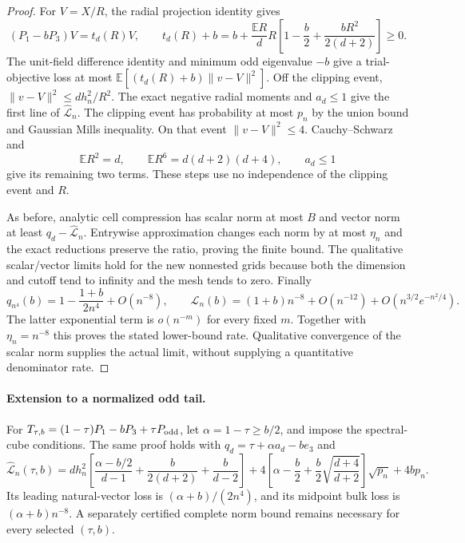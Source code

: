 \begin{proof}
For $V=X/R$, the radial projection identity gives
\[
 (P_1-bP_3)V=t_d(R)V,\qquad
 t_d(R)+b=b+\frac{\mathbb ER}{d}R
           \left[1-\frac b2+\frac{bR^2}{2(d+2)}\right]\geq0.
\]
The unit-field difference identity and minimum odd eigenvalue $-b$
give a trial-objective loss at most
$\mathbb E[(t_d(R)+b)\|v-V\|^2]$.
Off the clipping event, $\|v-V\|^2\leq dh_n^2/R^2$.
The exact negative radial moments and $a_d\leq1$ give the first
line of $\widehat{\mathcal L}_n$.  The clipping event has probability
at most $p_n$ by the union bound and Gaussian Mills inequality.
On that event $\|v-V\|^2\leq4$.  Cauchy--Schwarz and
\[
 \mathbb ER^2=d,\qquad \mathbb ER^6=d(d+2)(d+4),\qquad a_d\leq1
\]
give its remaining two terms.  These steps use no independence of
the clipping event and $R$.

As before, analytic cell compression has scalar norm at most $B$
and vector norm at least $q_d-\widehat{\mathcal L}_n$.
Entrywise approximation changes each norm by at most $\eta_n$ and
the exact reductions preserve the ratio, proving the finite bound.
The qualitative scalar/vector limits hold for the new nonnested
grids because both the dimension and cutoff tend to infinity and
the mesh tends to zero.
Finally
\[
 q_{n^4}(b)=1-\frac{1+b}{2n^4}+O(n^{-8}),\qquad
 \widehat{\mathcal L}_n(b)=(1+b)n^{-8}+O(n^{-12})
                         +O(n^{3/2}e^{-n^2/4}).
\]
The latter exponential term is $o(n^{-m})$ for every fixed $m$.
Together with $\eta_n=n^{-8}$ this proves the stated lower-bound
rate.  Qualitative convergence of the scalar norm supplies the
actual limit, without supplying a quantitative denominator rate.
\end{proof}

\paragraph{Extension to a normalized odd tail.}
For $T_{\tau,b}=(1-\tau)P_1-bP_3+\tau P_{\rm odd}$, let
$\alpha=1-\tau\geq b/2$, and impose the spectral-cube conditions.
The same proof holds with $q_d=\tau+\alpha a_d-be_3$ and
\[
 \widehat{\mathcal L}_n(\tau,b)=dh_n^2
 \left[\frac{\alpha-b/2}{d-1}+\frac b{2(d+2)}+\frac b{d-2}\right]
 +4\left[\alpha-\frac b2+\frac b2\sqrt{\frac{d+4}{d+2}}\right]
                       \sqrt{p_n}+4bp_n.
\]
Its leading natural-vector loss is $(\alpha+b)/(2n^4)$, and its
midpoint bulk loss is $(\alpha+b)n^{-8}$.  A separately certified
complete norm bound remains necessary for every selected $(\tau,b)$.
